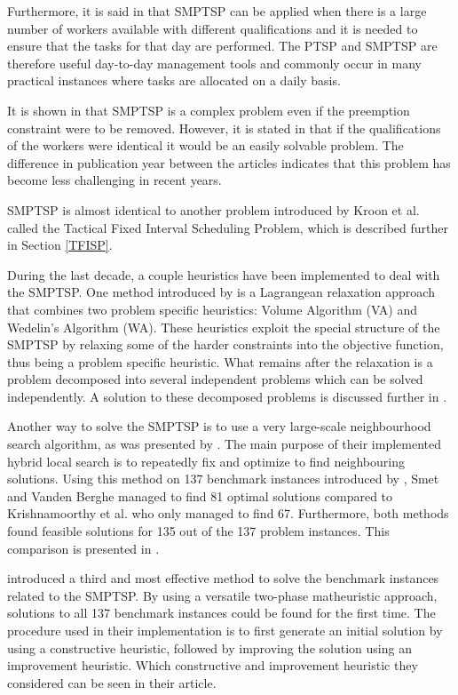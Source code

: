 Furthermore, it is said in \citet{krishnamoorthy_2012} that SMPTSP can be applied when there is a large number of workers available with different qualifications and it is needed to ensure that the tasks for that day are performed. The PTSP and SMPTSP are therefore useful day-to-day management tools and commonly occur in many practical instances where tasks are allocated on a daily basis.

It is shown in \citet{kroon_1995} that SMPTSP is a complex problem even if the preemption constraint were to be removed. However, it is stated in \citet{krishnamoorthy_2012} that if the qualifications of the workers were identical it would be an easily solvable problem. The difference in publication year between the articles indicates that this problem has become less challenging in recent years.

SMPTSP is almost identical to another problem introduced by Kroon et al. called the Tactical Fixed Interval Scheduling Problem, which is described further in Section \ref{TFISP}.

During the last decade, a couple heuristics have been implemented to deal with the SMPTSP. One method introduced by \citet{krishnamoorthy_2012} is a Lagrangean relaxation approach that combines two problem specific heuristics: Volume Algorithm (VA) and Wedelin's Algorithm (WA). These heuristics exploit the special structure of the SMPTSP by relaxing some of the harder constraints into the objective function, thus being a problem specific heuristic. What remains after the relaxation is a problem decomposed into several independent problems which can be solved independently. A solution to these decomposed problems is discussed further in \citet{krishnamoorthy_2012}.

Another way to solve the SMPTSP is to use a very large-scale neighbourhood search algorithm, as was presented by \citet{smet_2012}. The main purpose of their implemented hybrid local search is to repeatedly fix and optimize to find neighbouring solutions. Using this method on 137 benchmark instances introduced by \citet{krishnamoorthy_2012}, Smet and Vanden Berghe managed to find 81 optimal solutions compared to Krishnamoorthy et al. who only managed to find 67. Furthermore, both methods found feasible solutions for 135 out of the 137 problem instances. This comparison is presented in \citet{smet_2014}.

\citet{smet_2014} introduced a third and most effective method to solve the benchmark instances related to the SMPTSP. By using a versatile two-phase matheuristic approach, solutions to all 137 benchmark instances could be found for the first time. The procedure used in their implementation is to first generate an initial solution by using a constructive heuristic, followed by improving the solution using an improvement heuristic. Which constructive and improvement heuristic they considered can be seen in their article.


